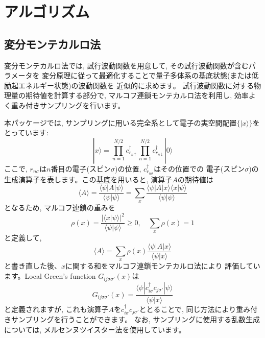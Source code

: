 \chapter{アルゴリズム}
\label{Ch:algorithm}
\section{変分モンテカルロ法}

変分モンテカルロ法では, 試行波動関数を用意して, その試行波動関数が含むパラメータを
変分原理に従って最適化することで量子多体系の基底状態(または低励起エネルギー状態)の波動関数を
近似的に求めます。
試行波動関数に対する物理量の期待値を計算する部分で, マルコフ連鎖モンテカルロ法を利用し, 
効率よく重み付きサンプリングを行います。

本パッケージでは, サンプリングに用いる完全系として電子の実空間配置$\{| x\rangle\}$をとっています:
\begin{equation}
| x\rangle =  \prod_{n=1}^{N/2} c_{r_{n\uparrow}}^{\dag} \prod_{n=1}^{N/2} c_{r_{n\downarrow}}^{\dag} |0 \rangle
\end{equation}
ここで, $r_{n\sigma}$は$n$番目の電子(スピン$\sigma$)の位置, $c_{r_{n\sigma}}^{\dag}$はその位置での
電子(スピン$\sigma$)の生成演算子を表します。この基底を用いると, 演算子$A$の期待値は
\begin{equation}
\langle A \rangle =\frac{\langle \psi| A| \psi \rangle}{\langle \psi | \psi \rangle} 
=\sum_x \frac{\langle \psi| A | x\rangle \langle x| \psi \rangle}{\langle \psi |\psi \rangle} 
\end{equation}
となるため, マルコフ連鎖の重みを
\begin{equation}
\rho(x)=\frac{|\langle x| \psi \rangle|^2}{\langle \psi | \psi \rangle} \ge 0, \quad \sum_{x} \rho(x)=1
\end{equation}
と定義して, 
\begin{equation}
\langle A \rangle =\sum_x \rho(x) \frac{\langle \psi| A | x\rangle }{\langle \psi |x \rangle} 
\end{equation}
と書き直した後、$x$に関する和をマルコフ連鎖モンテカルロ法により
評価しています。Local Green's function $G_{ij\sigma\sigma'}(x)$は
\begin{equation}
G_{ij\sigma\sigma'}(x)=\frac{\langle \psi | c_{i\sigma}^{\dag} c_{j\sigma'} | \psi \rangle}{\langle \psi | x \rangle}
\end{equation}
と定義されますが, これも演算子$A$を$c_{i\sigma}^{\dag} c_{j\sigma'}$ととることで, 
同じ方法により重み付きサンプリングを行うことができます。
なお, サンプリングに使用する乱数生成については, メルセンヌツイスター法を使用しています\cite{Mutsuo2008}。

